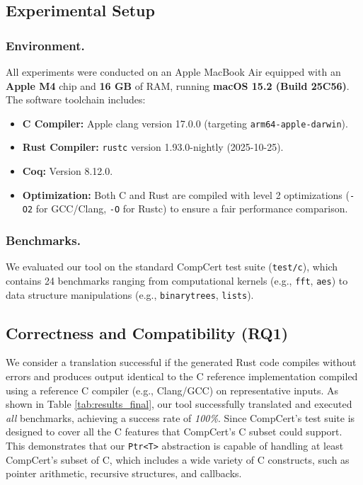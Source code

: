 \documentclass{llncs} %
\begin{document}
\subsection{Experimental Setup}

\subsubsection{Environment.}
All experiments were conducted on an Apple MacBook Air equipped with an \textbf{Apple M4} chip and \textbf{16 GB} of RAM, running \textbf{macOS 15.2 (Build 25C56)}. The software toolchain includes:
\begin{itemize}
    \item \textbf{C Compiler:} Apple clang version 17.0.0 (targeting \texttt{arm64-apple-darwin}).
    \item \textbf{Rust Compiler:} \texttt{rustc} version 1.93.0-nightly (2025-10-25).
    \item \textbf{Coq:} Version 8.12.0.
    \item \textbf{Optimization:} Both C and Rust are compiled with level 2 optimizations (\texttt{-O2} for GCC/Clang, \texttt{-O} for Rustc) to ensure a fair performance comparison.
\end{itemize}

\subsubsection{Benchmarks.}
We evaluated our tool on the standard CompCert test suite (\texttt{test/c}), which contains 24 benchmarks ranging from computational kernels (e.g., \texttt{fft}, \texttt{aes}) to data structure manipulations (e.g., \texttt{binarytrees}, \texttt{lists}). 

\subsection{Correctness and Compatibility (RQ1)}

We consider a translation successful if the generated Rust code compiles without errors and produces output identical to the C reference implementation compiled using a reference C compiler (e.g., Clang/GCC) on representative inputs.
As shown in Table \ref{tab:results_final}, our tool successfully translated and executed \emph{all} benchmarks, achieving a success rate of \emph{100\%}. Since CompCert's test suite is designed to cover all the C features that CompCert's C subset could support. This demonstrates that our \texttt{Ptr<T>} abstraction is capable of handling at least CompCert's subset of C, which includes a wide variety of C constructs, such as pointer arithmetic, recursive structures, and callbacks.
\end{document}
